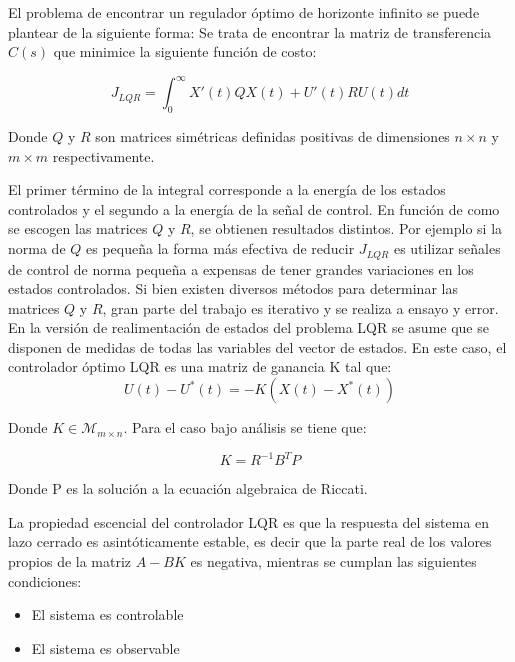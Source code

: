 \documentclass[main]{subfiles}
\begin{document}
El problema de encontrar un regulador \'optimo de horizonte infinito se puede plantear de la siguiente forma: Se trata de encontrar la matriz de transferencia $C(s)$ que minimice la siguiente funci\'on de costo:

\begin{equation}
\label{eq:lqr}
J_{LQR} = \int_{0}^{\infty}  X'(t)Q X(t)+U'(t)RU(t)dt
\end{equation}

Donde $Q$ y $R$ son matrices sim\'etricas definidas positivas de dimensiones $n\times n$ y $m\times m$ respectivamente. 

El primer t\'ermino de la integral corresponde a la energ\'ia de los estados controlados y el segundo a la energ\'ia de la señal de control. En funci\'on de como se escogen las matrices $Q$ y $R$, se obtienen resultados distintos. Por ejemplo si la norma de $Q$ es pequeña la forma m\'as efectiva de reducir $J_{LQR}$ es utilizar señales de control de norma pequeña a expensas de tener grandes variaciones en los estados controlados. Si bien existen diversos m\'etodos para determinar las matrices $Q$ y $R$, gran parte del trabajo es iterativo y se realiza a ensayo y error.\\  

En la versi\'on de realimentaci\'on de estados del problema LQR se asume que se disponen de medidas de todas las variables del vector de estados. En este caso, el controlador \'optimo LQR es una matriz de ganancia K tal que:
\begin{equation}
U(t)-U^*(t) = -K(X(t)-X^*(t))
\end{equation}

Donde $K\in\mathcal{M}_{m\times n}$. Para el caso bajo an\'alisis se tiene que: 

\begin{equation}
K = R^{-1}B^TP
\end{equation}

Donde P es la soluci\'on a la ecuaci\'on algebraica de Riccati.

La propiedad escencial del controlador LQR es que la respuesta del sistema en lazo cerrado es asint\'oticamente estable, es decir que la parte real de los valores propios de la matriz $A-BK$ es negativa, mientras se cumplan las siguientes condiciones:

\begin{itemize}
\item El sistema es controlable
\item El sistema es observable
\end{itemize}
\end{document}
